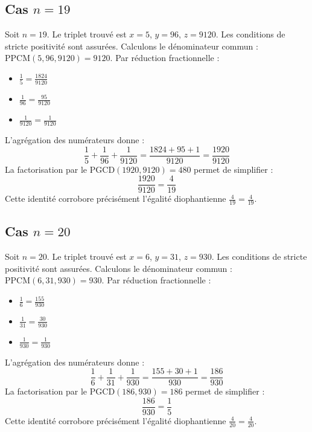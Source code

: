 \documentclass[11pt,a4paper]{article}
\begin{document}
\subsection{Cas $n = 19$}
Soit $n = 19$. Le triplet trouvé est $x = 5$, $y = 96$, $z = 9120$.
Les conditions de stricte positivité sont assurées.
Calculons le dénominateur commun : $\text{PPCM}(5, 96, 9120) = 9120$.
Par réduction fractionnelle :
\begin{itemize}
    \item $\frac{1}{5} = \frac{1824}{9120}$
    \item $\frac{1}{96} = \frac{95}{9120}$
    \item $\frac{1}{9120} = \frac{1}{9120}$
\end{itemize}
L'agrégation des numérateurs donne :
$$ \frac{1}{5} + \frac{1}{96} + \frac{1}{9120} = \frac{1824 + 95 + 1}{9120} = \frac{1920}{9120} $$
La factorisation par le $\text{PGCD}(1920, 9120) = 480$ permet de simplifier :
$$ \frac{1920}{9120} = \frac{4}{19} $$
Cette identité corrobore précisément l'égalité diophantienne $\frac{4}{19} = \frac{4}{19}$.

\subsection{Cas $n = 20$}
Soit $n = 20$. Le triplet trouvé est $x = 6$, $y = 31$, $z = 930$.
Les conditions de stricte positivité sont assurées.
Calculons le dénominateur commun : $\text{PPCM}(6, 31, 930) = 930$.
Par réduction fractionnelle :
\begin{itemize}
    \item $\frac{1}{6} = \frac{155}{930}$
    \item $\frac{1}{31} = \frac{30}{930}$
    \item $\frac{1}{930} = \frac{1}{930}$
\end{itemize}
L'agrégation des numérateurs donne :
$$ \frac{1}{6} + \frac{1}{31} + \frac{1}{930} = \frac{155 + 30 + 1}{930} = \frac{186}{930} $$
La factorisation par le $\text{PGCD}(186, 930) = 186$ permet de simplifier :
$$ \frac{186}{930} = \frac{1}{5} $$
Cette identité corrobore précisément l'égalité diophantienne $\frac{4}{20} = \frac{4}{20}$.
\end{document}
